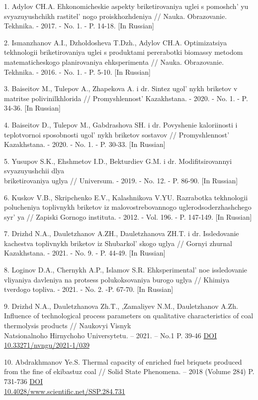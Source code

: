 \begin{references}
1. Adylov CH.A. Ehkonomicheskie aspekty briketirovaniya uglei s
pomoshch' yu svyazuyushchikh
rastitel' nogo proiskhozhdeniya // Nauka. Obrazovanie.
Tekhnika. - 2017. - No. 1. - P. 14-18. {[}In Russian{]}

2. Ismanzhanov A.I., Dzholdosheva T.Dzh., Adylov CH.A. Optimizatsiya
tekhnologii briketirovaniya uglei s produktami pererabotki biomassy
metodom matematicheskogo planirovaniya ehksperimenta // Nauka.
Obrazovanie. Tekhnika. - 2016. - No. 1. - P. 5-10. {[}In Russian{]}

3. Baiseitov M., Tulepov A., Zhapekova A. i dr. Sintez
ugol' nykh briketov v matritse polivinilkhlorida //
Promyshlennost'{} Kazakhstana. - 2020. - No. 1. - P.
34-36. {[}In Russian{]}

4. Baiseitov D., Tulepov M., Gabdrashova SH. i dr. Povyshenie
kaloriinosti i teplotvornoi sposobnosti ugol' nykh
briketov sostavov // Promyshlennost'{} Kazakhstana. -
2020. - No. 1. - P. 30-33. {[}In Russian{]}

5. Yusupov S.K., Ehshmetov I.D., Bekturdiev G.M. i dr. Modifitsirovannyi
svyazuyushchii dlya \\briketirovaniya uglya // Universum. - 2019. - No.
12. - P. 86-90. {[}In Russian{]}

6. Kuskov V.B., Skripchenko E.V., Kalashnikova V.YU. Razrabotka
tekhnologii polucheniya toplivnykh briketov iz malovostrebovannogo
uglerodsoderzhashchego syr' ya // Zapiski Gornogo
instituta. - 2012. - Vol. 196. - P. 147-149. {[}In Russian{]}

7. Drizhd N.A., Dauletzhanov A.ZH., Dauletzhanova ZH.T. i dr.
Issledovanie kachestva toplivnykh briketov iz
Shubarkol' skogo uglya // Gornyi zhurnal Kazakhstana. -
2021. - No. 9. - P. 44-49. {[}In Russian{]}

8. Loginov D.A., Chernykh A.P., Islamov S.R.
Ehksperimental' noe issledovanie vliyaniya davleniya na
protsess polukoksovaniya burogo uglya // Khimiya tverdogo topliva. -
2021. - No. 2. -P. 67-70. {[}In Russian{]}

9. Drizhd N.A., Dauletzhanova Zh.T., ,Zamaliyev N.M., Dauletzhanov A.Zh.
Influence of technological process parameters on qualitative
characteristics of coal thermolysis products // Naukovyi Visnyk\\
Natsionalnoho Hirnychoho Universytetu. -- 2021. -- No.1 P. 39-46
\href{https://doi.org/10.33271/nvngu/2021-1/039}{DOI
10.33271/nvngu/2021-1/039}

10. Abdrakhmanov Ye.S. Thermal capacity of enriched fuel briquets
produced from the fine of ekibastuz coal // Solid State Phenomena. --
2018 (Volume 284) P. 731-736
\href{https://doi.org/10.4028/www.scientific.net/SSP.284.731}{DOI\\
10.4028/www.scientific.net/SSP.284.731}


\end{references}
